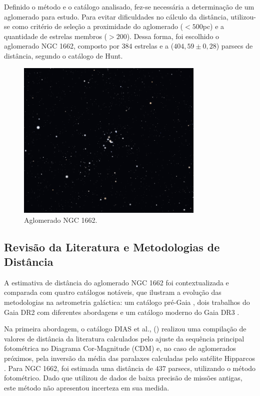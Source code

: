 \documentclass[12pt]{projeto}
\begin{document}
Definido o método e o catálogo analisado, fez-se necessária a determinação de um aglomerado para estudo. Para evitar dificuldades no cálculo da distância, utilizou-se como critério de seleção a proximidade do aglomerado (\(<500\)pc) e a quantidade de estrelas membros (\(>200\)). Dessa forma, foi escolhido o aglomerado NGC 1662, composto por \(384\) estrelas e a (\(404,59 \pm 0,28\)) parsecs de distância, segundo o catálogo de Hunt.
\begin{figure}[ht]
\centering
\includegraphics[width= 0.8\textwidth]{NGC_1662.png}
\caption{\label{fig:Capivara_decomposition} Aglomerado NGC 1662.}
\end{figure}

\subsection{Revisão da Literatura e Metodologias de Distância}

A estimativa de distância do aglomerado NGC 1662 foi contextualizada e comparada com quatro catálogos notáveis, que ilustram a evolução das metodologias na astrometria galáctica: um catálogo pré-Gaia \cite{dias_new_2002}, dois trabalhos do Gaia DR2 com diferentes abordagens \cite{cantat-gaudin_painting_2020, dias_updated_2021} e um catálogo moderno do Gaia DR3 \cite{hunt_improving_2024}.

Na primeira abordagem, o catálogo DIAS et al., (\citeyear{dias_new_2002})  realizou uma compilação de valores de distância da literatura calculados pelo ajuste da sequência principal fotométrica no Diagrama Cor-Magnitude (CDM) e, no caso de aglomerados próximos, pela inversão da média das paralaxes calculadas pelo satélite Hipparcos \cite{esa_hipparcos_1997}. Para NGC 1662, foi estimada uma distância de \(437\) parsecs, utilizando o método fotométrico. Dado que utilizou de dados de baixa precisão de missões antigas, este método não apresentou incerteza em sua medida.
\end{document}
